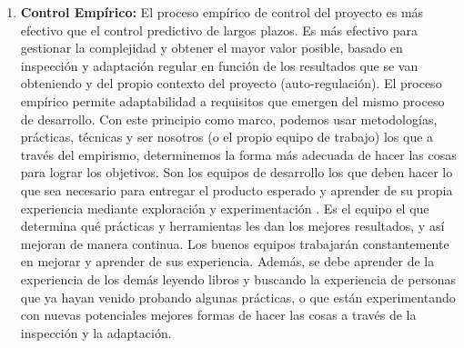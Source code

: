 \begin{enumerate}

\item \textbf{Control Empírico:} El proceso empírico de control del proyecto es más efectivo que el control predictivo de largos plazos. Es más efectivo para gestionar la complejidad y obtener el mayor valor posible, basado en inspección y adaptación regular en función de los resultados que se van obteniendo y del propio contexto del proyecto (auto-regulación). El proceso empírico permite adaptabilidad a requisitos que emergen del mismo proceso de desarrollo. Con este principio como marco, podemos usar metodologías, prácticas, técnicas y ser nosotros (o el propio equipo de trabajo) los que a través del empirismo, determinemos la forma más adecuada de hacer las cosas para lograr los objetivos. Son los equipos de desarrollo los que deben hacer lo que sea necesario para entregar el producto esperado y aprender de su propia experiencia mediante exploración y experimentación \cite{UNTREF-2014}. Es el equipo el que determina qué prácticas y herramientas les dan los mejores resultados, y así mejoran de manera continua. Los buenos equipos trabajarán constantemente en mejorar y aprender de sus experiencia. Además, se debe aprender de la experiencia de los demás leyendo libros y buscando la experiencia de personas que ya hayan venido probando algunas prácticas, o que están experimentando con nuevas potenciales mejores formas de hacer las cosas a través de la inspección y la adaptación. 


\end{enumerate}
